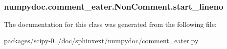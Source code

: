 \subsubsection[{start\+\_\+lineno}]{\setlength{\rightskip}{0pt plus 5cm}numpydoc.\+comment\+\_\+eater.\+Non\+Comment.\+start\+\_\+lineno}\label{classnumpydoc_1_1comment__eater_1_1NonComment_a4c1284415a9ccb0a3a0782ee74f048db}


The documentation for this class was generated from the following file\+:\begin{DoxyCompactItemize}
\item 
packages/scipy-\/0../doc/sphinxext/numpydoc/\hyperlink{comment__eater_8py}{comment\+\_\+eater.\+py}\end{DoxyCompactItemize}
